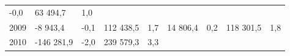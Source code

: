 \begin{longtable}[]{@{}lllllllll@{}}
\begin{minipage}[t]{0.06\columnwidth}
-0,0\strut
\end{minipage} & \begin{minipage}[t]{0.08\columnwidth}\raggedright
63 494,7\strut
\end{minipage} & \begin{minipage}[t]{0.06\columnwidth}\raggedright
1,0\strut
\end{minipage}\tabularnewline
\begin{minipage}[t]{0.05\columnwidth}\raggedright
2009\strut
\end{minipage} & \begin{minipage}[t]{0.10\columnwidth}\raggedright
-8 943,4\strut
\end{minipage} & \begin{minipage}[t]{0.06\columnwidth}\raggedright
-0,1\strut
\end{minipage} & \begin{minipage}[t]{0.17\columnwidth}\raggedright
112 438,5\strut
\end{minipage} & \begin{minipage}[t]{0.06\columnwidth}\raggedright
1,7\strut
\end{minipage} & \begin{minipage}[t]{0.12\columnwidth}\raggedright
14 806,4\strut
\end{minipage} & \begin{minipage}[t]{0.06\columnwidth}\raggedright
0,2\strut
\end{minipage} & \begin{minipage}[t]{0.08\columnwidth}\raggedright
118 301,5\strut
\end{minipage} & \begin{minipage}[t]{0.06\columnwidth}\raggedright
1,8\strut
\end{minipage}\tabularnewline
\begin{minipage}[t]{0.05\columnwidth}\raggedright
2010\strut
\end{minipage} & \begin{minipage}[t]{0.10\columnwidth}\raggedright
-146 281,9\strut
\end{minipage} & \begin{minipage}[t]{0.06\columnwidth}\raggedright
-2,0\strut
\end{minipage} & \begin{minipage}[t]{0.17\columnwidth}\raggedright
239 579,3\strut
\end{minipage} & \begin{minipage}[t]{0.06\columnwidth}\raggedright
3,3\strut
\end{minipage} & \begin{minipage}[t]{0.12\columnwidth}\raggedright

\end{minipage}
\end{longtable}
